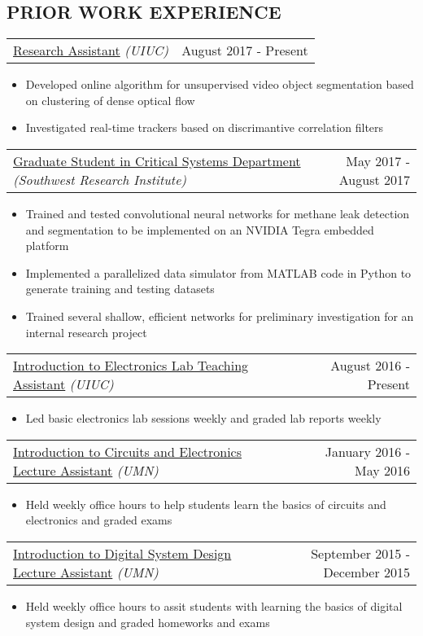 \documentclass[10pt, letterpaper]{article}
\makeatletter
\newcommand{\headerrow}[2]
{\begin{tabular*}{\linewidth}{l@{\extracolsep{\fill}}r}
	#1 &
	#2 \\
\end{tabular*}}
\newcommand{\sansserif}{\cabin}
\makeatother
\begin{document}
\subsection*{\sansserif PRIOR WORK EXPERIENCE}

\headerrow
	{\uline{Research Assistant} \textit{(UIUC)}}
	{August 2017 - Present}
	\begin{itemize}
		\item Developed online algorithm for unsupervised video object segmentation based on clustering of dense optical flow
		\item Investigated real-time trackers based on discrimantive correlation filters
	\end{itemize}

\headerrow
	{\uline{Graduate Student in Critical Systems Department} \textit{(Southwest Research Institute)}}
	{May 2017 - August 2017}
	\begin{itemize}
		\item Trained and tested convolutional neural networks for methane leak detection and segmentation to be implemented on an NVIDIA Tegra embedded platform
		\item Implemented a parallelized data simulator from MATLAB code in Python to generate training and testing datasets
		\item Trained several shallow, efficient networks for preliminary investigation for an internal research project
	\end{itemize}

\headerrow
	{\uline{Introduction to Electronics Lab Teaching Assistant} \textit{(UIUC)}}
	{August 2016 - Present}
	\begin{itemize}
		\item Led basic electronics lab sessions weekly and graded lab reports weekly
	\end{itemize}

\headerrow
	{\uline{Introduction to Circuits and Electronics Lecture Assistant} \textit{(UMN)}}
	{January 2016 - May 2016}
	\begin{itemize}
		\item Held weekly office hours to help students learn the basics of circuits and electronics and graded exams
	\end{itemize}

\headerrow
	{\uline{Introduction to Digital System Design Lecture Assistant} \textit{(UMN)}}
	{September 2015 - December 2015}
	\begin{itemize}
		\item Held weekly office hours to assit students with learning the basics of digital system design and graded homeworks and exams%
	\end{itemize}
\end{document}
